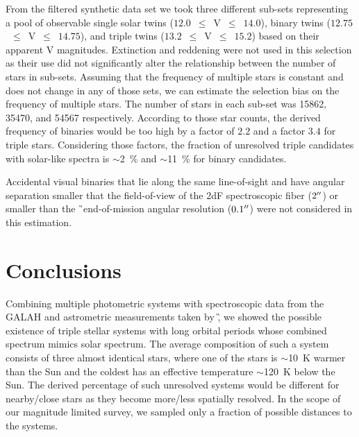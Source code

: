 From the filtered synthetic data set we took three different sub-sets representing a pool of observable single solar twins ($12.0$~$\leq$~V~$\leq$~$14.0$), binary twins ($12.75$~$\leq$~V~$\leq$~$14.75$), and triple twins ($13.2$~$\leq$~V~$\leq$~$15.2$) based on their apparent V magnitudes. Extinction and reddening were not used in this selection as their use did not significantly alter the relationship between the number of stars in sub-sets. Assuming that the frequency of multiple stars is constant and does not change in any of those sets, we can estimate the selection bias on the frequency of multiple stars. The number of stars in each sub-set was 15862, 35470, and 54567 respectively. According to those star counts, the derived frequency of binaries would be too high by a factor of $2.2$ and a factor $3.4$ for triple stars. Considering those factors, the fraction of unresolved triple candidates with solar-like spectra is $\sim$2~\% and $\sim$11~\% for binary candidates. 

Accidental visual binaries that lie along the same line-of-sight and have angular separation smaller that the field-of-view of the 2dF spectroscopic fiber ($2 \hbox{$^{\prime\prime}$}$) or smaller than the \G\ end-of-mission angular resolution ($0.1 \hbox{$^{\prime\prime}$}$) were not considered in this estimation.

\section{Conclusions}
\label{sec:concl}
Combining multiple photometric systems with spectroscopic data from the GALAH and astrometric measurements taken by \G, we showed the possible existence of triple stellar systems with long orbital periods whose combined spectrum mimics solar spectrum. The average composition of such a system consists of three almost identical stars, where one of the stars is $\sim$10~K warmer than the Sun and the coldest has an effective temperature $\sim$120~K below the Sun. The derived percentage of such unresolved systems would be different for nearby/close stars as they become more/less spatially resolved. In the scope of our magnitude limited survey, we sampled only a fraction of possible distances to the systems.

